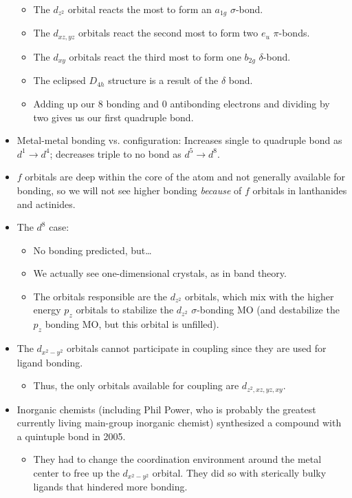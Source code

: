 \documentclass[../notes.tex]{subfiles}
\begin{document}
\begin{itemize}
\begin{itemize}
\begin{itemize}
        \end{itemize}
        \item The $d_{z^2}$ orbital reacts the most to form an $a_{1g}$ $\sigma$-bond.
        \item The $d_{xz,yz}$ orbitals react the second most to form two $e_u$ $\pi$-bonds.
        \item The $d_{xy}$ orbitals react the third most to form one $b_{2g}$ $\delta$-bond.
        \item The eclipsed $D_{4h}$ structure is a result of the $\delta$ bond.
        \item Adding up our 8 bonding and 0 antibonding electrons and dividing by two gives us our first quadruple bond.
    \end{itemize}
    \item Metal-metal bonding vs. configuration: Increases single to quadruple bond as $d^1\to d^4$; decreases triple to no bond as $d^5\to d^8$.
    \item $f$ orbitals are deep within the core of the atom and not generally available for bonding, so we will not see higher bonding \emph{because} of $f$ orbitals in lanthanides and actinides.
    \item The $d^8$ case:
    \begin{itemize}
        \item No bonding predicted, but\dots
        \item We actually see one-dimensional crystals, as in band theory.
        \item The orbitals responsible are the $d_{z^2}$ orbitals, which mix with the higher energy $p_z$ orbitals to stabilize the $d_{z^2}$ $\sigma$-bonding MO (and destabilize the $p_z$ bonding MO, but this orbital is unfilled).
    \end{itemize}
    \item The $d_{x^2-y^2}$ orbitals cannot participate in  coupling since they are used for ligand bonding.
    \begin{itemize}
        \item Thus, the only orbitals available for coupling are $d_{z^2,xz,yz,xy}$.
    \end{itemize}
    \item Inorganic chemists (including Phil Power, who is probably the greatest currently living main-group inorganic chemist) synthesized a compound with a quintuple bond in 2005.
    \begin{itemize}
        \item They had to change the coordination environment around the metal center to free up the $d_{x^2-y^2}$ orbital. They did so with sterically bulky ligands that hindered more bonding.

\end{itemize}
\end{itemize}
\end{document}
